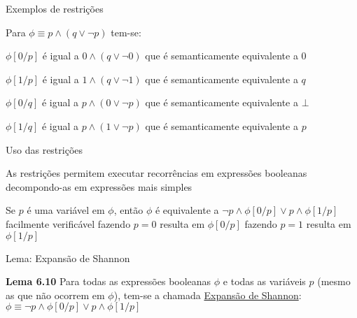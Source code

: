 \expandafter\documentclass\expandafter[table, usenames, svgnames, dvipsnames,14pt, \classopts]{beamer}
\begin{document}
\begin{frame}{Exemplos de restrições}

    Para $\phi \equiv p \land (q \lor \lnot{p})$ tem-se:

    \begin{outline}
        \1 $\phi[0/p]$ é igual a $0 \land (q \lor \lnot{0})$
            \2[-] que é semanticamente equivalente a $0$
            
        \vspace{1em}
        
        \1 $\phi[1/p]$ é igual a $1 \land (q \lor \lnot{1})$
            \2[-] que é semanticamente equivalente a $q$
            
        \vspace{1em}
        
        \1 $\phi[0/q]$ é igual a $p \land (0 \lor \lnot{p})$
            \2[-] que é semanticamente equivalente a $\bot$
            
        \vspace{1em}
        
        \1 $\phi[1/q]$ é igual a $p \land (1 \lor \lnot{p})$
            \2[-] que é semanticamente equivalente a $p$
    \end{outline}
    
\end{frame}

\begin{frame}{Uso das restrições}

    \begin{outline}
        \1 As restrições permitem executar recorrências em expressões booleanas decompondo-as em expressões mais simples
        
        \vspace{1em}
        
        \1 Se $p$ é uma variável em $\phi$, então $\phi$ é equivalente a $\lnot{p} \land \phi[0/p] \lor p \land \phi[1/p]$
            \2[-] facilmente verificável
            \2[-] fazendo $p = 0$ resulta em $\phi[0/p]$
            \2[-] fazendo $p = 1$ resulta em $\phi[1/p]$
    \end{outline}

\end{frame}

\begin{frame}{Lema: Expansão de Shannon}

    \begin{block}{\textbf{Lema 6.10}}
        Para todas as expressões booleanas $\phi$ e todas as variáveis $p$ (mesmo as que não ocorrem em $\phi$), tem-se a chamada \underline{Expansão de Shannon}:\\[1em]
        $\phi \equiv \lnot{p} \land \phi[0/p] \lor p \land \phi[1/p]$
    \end{block}

\end{frame}
\end{document}
